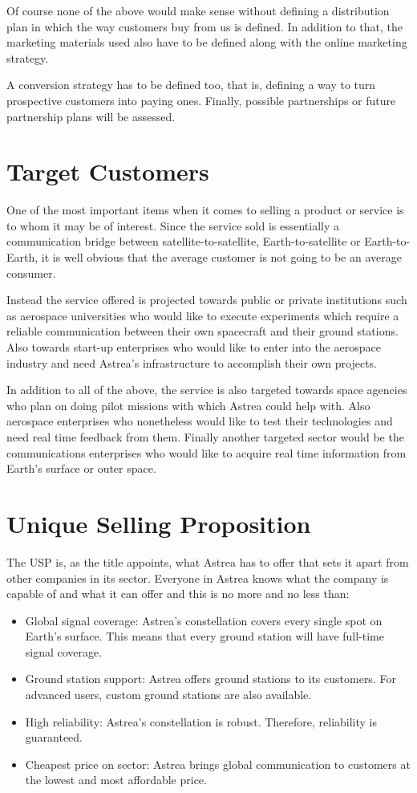 Of course none of the above would make sense without defining a distribution plan in which the way customers buy from us is defined. In addition to that, the marketing materials used also have to be defined along with the online marketing strategy.

A conversion strategy has to be defined too, that is, defining a way to turn prospective customers into paying ones. Finally, possible partnerships or future partnership plans will be assessed.

\section{Target Customers}
One of the most important items when it comes to selling a product or service is to whom it may be of interest. Since the service sold is essentially a communication bridge between satellite-to-satellite, Earth-to-satellite or Earth-to-Earth, it is well obvious that the average customer is not going to be an average consumer.

Instead the service offered is projected towards public or private institutions such as aerospace universities who would like to execute experiments which require a reliable communication between their own spacecraft and their ground stations. Also towards start-up enterprises who would like to enter into the aerospace industry and need Astrea's infrastructure to accomplish their own projects.

In addition to all of the above, the service is also targeted towards space agencies who plan on doing pilot missions with which Astrea could help with. Also aerospace enterprises who nonetheless would like to test their technologies and need real time feedback from them. Finally another targeted sector would be the communications enterprises who would like to acquire real time information from Earth's surface or outer space.

\section{Unique Selling Proposition}
The USP is, as the title appoints, what Astrea has to offer that sets it apart from other companies in its sector. Everyone in Astrea knows what the company is capable of and what it can offer and this is no more and no less than:

\begin{itemize}
\item Global signal coverage: Astrea's constellation covers every single spot on Earth's surface. This means that every ground station will have full-time signal coverage.
\item Ground station support: Astrea offers ground stations to its customers. For advanced users, custom ground stations are also available.
\item High reliability: Astrea's constellation is robust. Therefore, reliability is guaranteed.
\item Cheapest price on sector: Astrea brings global communication to customers at the lowest and most affordable price.
\end{itemize}

